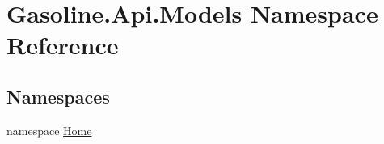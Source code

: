 \hypertarget{namespace_gasoline_1_1_api_1_1_models}{}\section{Gasoline.\+Api.\+Models Namespace Reference}
\label{namespace_gasoline_1_1_api_1_1_models}
\subsection*{Namespaces}
\begin{DoxyCompactItemize}
\item 
namespace \mbox{\hyperlink{namespace_gasoline_1_1_api_1_1_models_1_1_home}{Home}}
\end{DoxyCompactItemize}
